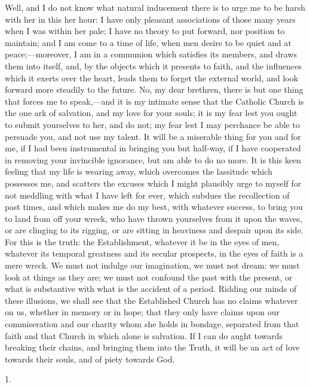 Well, and I do not know what natural inducement there is to urge me
to be harsh with her in this her hour: I have only pleasant
associations of those many years when I was within her pale; I have no
theory to put forward, nor position to maintain; and I am come to a
time of life, when men desire to be quiet and at peace;—moreover, I
am in a communion which satisfies its members, and draws them into
itself, and, by the objects which it presents to faith, and the
influences which it exerts over the heart, leads them to forget the
external world, and look forward more steadily to the future. No, my
dear brethren, there is but one thing that forces me to speak,—and
it is my intimate sense that the Catholic Church is the one ark of
salvation, and my love for your souls; it is my fear lest you ought to
submit yourselves to her, and do not; my fear lest I may perchance be
able to persuade you, and not use my talent. It will be a miserable
thing for you and for me, if I had been instrumental in bringing you
but half-way, if I have cooperated in removing your invincible
ignorance, but am able to do no more. It is this keen feeling that my
life is wearing away, which overcomes the lassitude which possesses
me, and scatters the excuses which I might plausibly urge to myself
for not meddling with what I have left for ever, which subdues the
recollection of past times, and which makes me do my best, with
whatever success, to bring you to land from off your wreck, who have
thrown yourselves from it upon the waves, or are clinging to its
rigging, or are sitting in heaviness and despair upon its side. For
this is the truth: the Establishment, whatever it be in the eyes of
men, whatever its temporal greatness and its secular prospects, in the
eyes of faith is a mere wreck. We must not indulge our imagination, we
must not dream: we must look at things as they are; we must not
confound the past with the present, or what is substantive with what
is the accident of a period. Ridding our minds of these illusions, we
shall see that the Established Church has no claims whatever on us,
whether in memory or in hope; that they only have claims upon our
commiseration and our charity whom she holds in bondage, separated
from that faith and that Church in which alone is salvation. If I can
do aught towards breaking their chains, and bringing them into the
Truth, it will be an act of love towards their souls, and of piety
towards God.

1.

